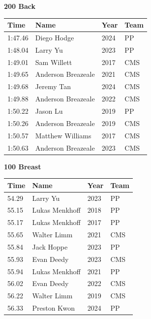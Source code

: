 \vspace{1.2em}
\noindent\begin{minipage}[t]{0.98\textwidth}
\centering
\textbf{\textcolor{teamprimary}{200 Back}}\par
\vspace{0.5em}
\centering
\small
\renewcommand{\arraystretch}{1.0}
\setlength{\tabcolsep}{4pt}
\begin{tabular}{@{}p{2.5cm}p{4.5cm}p{1.5cm}p{2.5cm}@{}}
\toprule
\textbf{Time} & \textbf{Name} & \textbf{Year} & \textbf{Team} \\
\midrule
1:47.46 & Diego Hodge & 2024 & PP \\
1:48.04 & Larry Yu & 2023 & PP \\
1:49.01 & Sam Willett & 2017 & CMS \\
1:49.65 & Anderson Breazeale & 2021 & CMS \\
1:49.68 & Jeremy Tan & 2024 & CMS \\
1:49.88 & Anderson Breazeale & 2022 & CMS \\
1:50.22 & Jason Lu & 2019 & PP \\
1:50.26 & Anderson Breazeale & 2019 & CMS \\
1:50.57 & Matthew Williams & 2017 & CMS \\
1:50.63 & Anderson Breazeale & 2023 & CMS \\
\bottomrule
\end{tabular}
\end{minipage}
\vspace{1.2em}
\noindent\begin{minipage}[t]{0.98\textwidth}
\centering
\textbf{\textcolor{teamprimary}{100 Breast}}\par
\vspace{0.5em}
\centering
\small
\renewcommand{\arraystretch}{1.0}
\setlength{\tabcolsep}{4pt}
\begin{tabular}{@{}p{2.5cm}p{4.5cm}p{1.5cm}p{2.5cm}@{}}
\toprule
\textbf{Time} & \textbf{Name} & \textbf{Year} & \textbf{Team} \\
\midrule
54.29 & Larry Yu & 2023 & PP \\
55.15 & Lukas Menkhoff & 2018 & PP \\
55.17 & Lukas Menkhoff & 2017 & PP \\
55.65 & Walter Limm & 2021 & CMS \\
55.84 & Jack Hoppe & 2023 & PP \\
55.93 & Evan Deedy & 2023 & CMS \\
55.94 & Lukas Menkhoff & 2021 & PP \\
56.02 & Evan Deedy & 2022 & CMS \\
56.22 & Walter Limm & 2019 & CMS \\
56.33 & Preston Kwon & 2024 & PP \\
\bottomrule
\end{tabular}
\end{minipage}
